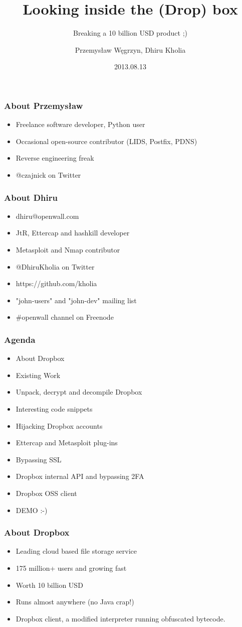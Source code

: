 \documentclass{beamer}
\title{Looking inside the (Drop) box}
\subtitle{Breaking a 10 billion USD product ;)}
\author{Przemysław Węgrzyn, Dhiru Kholia}
\date{2013.08.13}
\newcommand\myfont{\fontsize{14}{20}\selectfont}
\begin{document}
\frame{\titlepage}

\begin{frame}
\frametitle{About Przemysław}
\begin{itemize}
\itemsep 3em
\item Freelance software developer, Python user
\item Occasional open-source contributor (LIDS, Postfix, PDNS)
\item Reverse engineering freak
\item @czajnick on Twitter
\end{itemize}
\end{frame}

\begin{frame}
\frametitle{About Dhiru}
\begin{itemize}
\itemsep 1.2em
\item dhiru@openwall.com
\item JtR, Ettercap and hashkill developer
\item Metasploit and Nmap contributor
\item @DhiruKholia on Twitter
\item https://github.com/kholia
\item "john-users" and "john-dev" mailing list
\item \#openwall channel on Freenode
\end{itemize}
\end{frame}

\begin{frame}
\frametitle{Agenda}
\begin{itemize}
\item About Dropbox
\item Existing Work
\item Unpack, decrypt and decompile Dropbox
\item Interesting code snippets
\item Hijacking Dropbox accounts
\item Ettercap and Metasploit plug-ins
\item Bypassing SSL
\item Dropbox internal API and bypassing 2FA
\item Dropbox OSS client
\item DEMO :-)
\end{itemize}
\end{frame}

\begin{frame}
\frametitle{About Dropbox}
\myfont
\begin{itemize}
\itemsep 1.2em
\item Leading cloud based file storage service

\item 175 million+ users and growing fast

\item Worth 10 billion USD

\item Runs almost anywhere (no Java crap!)

\item Dropbox client, a modified interpreter running obfuscated bytecode.
\end{itemize}
\end{frame}
\end{document}
